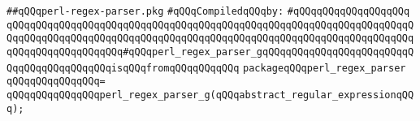 \label{src/lib/regex/front/perl-regex-parser.pkg}
\verb|##qQQqperl-regex-parser.pkg|\newline
\newline
\verb|#qQQqCompiledqQQqby:|\newline
\verb|#qQQqqQQqqQQqqQQqqQQq|\newline
\newline
\verb|qQQqqQQqqQQqqQQqqQQqqQQqqQQqqQQqqQQqqQQqqQQqqQQqqQQqqQQqqQQqqQQqqQQqqQQqqQQqqQQqqQQqqQQqqQQqqQQqqQQqqQQqqQQqqQQqqQQqqQQqqQQqqQQqqQQqqQQqqQQqqQQqqQQqqQQqqQQqqQQq#qQQqperl_regex_parser_gqQQqqQQqqQQqqQQqqQQqqQQqqQQqqQQqqQQqqQQqqQQqisqQQqfromqQQqqQQqqQQq|\newline
\newline
\verb|packageqQQqperl_regex_parser|\newline
\verb|qQQqqQQqqQQqqQQq=|\newline
\verb|qQQqqQQqqQQqqQQqperl_regex_parser_g(qQQqabstract_regular_expressionqQQq);|\newline

